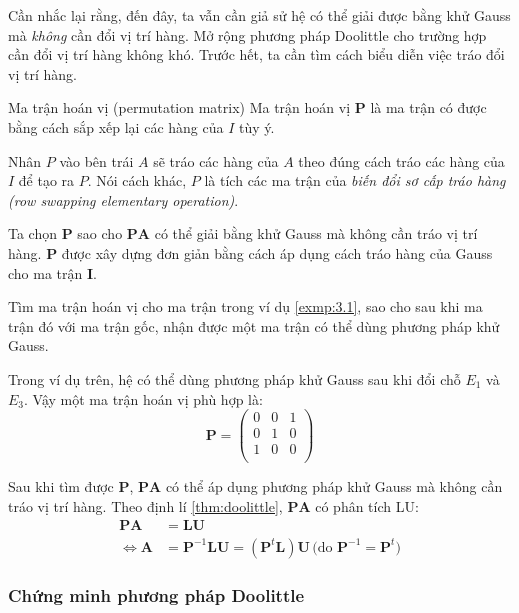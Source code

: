 \documentclass[../../Lectures]{subfiles}
\begin{document}
Cần nhắc lại rằng, đến đây, ta vẫn cần giả sử hệ có thể giải được bằng khử Gauss
mà \emph{không} cần đổi vị trí hàng. Mở rộng phương pháp Doolittle cho trường
hợp cần đổi vị trí hàng không khó. Trước hết, ta cần tìm cách biểu diễn việc
tráo đổi vị trí hàng.

\begin{cdefinition}{Ma trận hoán vị (permutation matrix)}{}
    Ma trận hoán vị \(\bm{P}\) là ma trận có được bằng cách sắp xếp lại các hàng
    của \(I\) tùy ý.
\end{cdefinition}

Nhân \(P\) vào bên trái \(A\) sẽ tráo các hàng của \(A\) theo đúng cách tráo các
hàng của \(I\) để tạo ra \(P\). Nói cách khác, \(P\) là tích các ma trận của
\emph{biến đổi sơ cấp tráo hàng (row swapping elementary operation)}.

Ta chọn \(\bm{P}\) sao cho \(\bm{PA}\) có thể giải bằng khử Gauss mà không cần
tráo vị trí hàng. \(\bm{P}\) được xây dựng đơn giản bằng cách áp dụng cách tráo
hàng của Gauss cho ma trận \(\bm{I}\).

\begin{exmp}
    Tìm ma trận hoán vị cho ma trận trong ví dụ \ref{exmp:3.1}, sao cho sau khi
    ma trận đó với ma trận gốc, nhận được một ma trận có thể dùng phương pháp
    khử Gauss.

    Trong ví dụ trên, hệ có thể dùng phương pháp khử Gauss sau khi đổi chỗ
    \(E_1\) và \(E_3\). Vậy một ma trận hoán vị phù hợp là:
    \[
        \bm{P} =
            \begin{pmatrix}
                0  &  0  &  1  \\
                0  &  1  &  0  \\
                1  &  0  &  0  \\
            \end{pmatrix}
    \]
\end{exmp}

Sau khi tìm được \(\bm{P}\), \(\bm{PA}\) có thể áp dụng phương pháp khử Gauss mà
không cần tráo vị trí hàng. Theo định lí \ref{thm:doolittle}, \(\bm{PA}\) có
phân tích LU:
\begin{align*}
        \bm{PA} &= \bm{LU} \\
    \iff \bm{A} &= \bm{P}^{-1} \bm{LU} = (\bm{P}^t \bm{L}) \bm{U} \, \text{(do \(\bm{P}^{-1} = \bm{P}^t\))}
\end{align*}

\subsubsection{Chứng minh phương pháp Doolittle}
\end{document}
